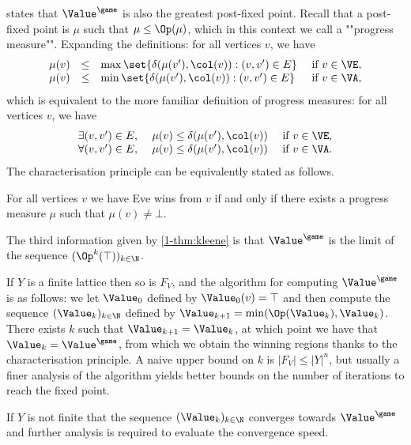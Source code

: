  states that $\Value^{\game}$ is also the greatest post-fixed point.
Recall that a post-fixed point is $\mu$ such that $\mu \le \Op(\mu)$, which in this context we call a ""progress measure"".
Expanding the definitions: for all vertices $v$, we have
\[
\begin{array}{llll}
\mu(v) & \le & \max \set{\delta( \mu(v'), \col(v)) : (v,v') \in E} & \text{ if } v \in \VE, \\
\mu(v) & \le & \min \set{\delta( \mu(v'), \col(v)) : (v,v') \in E} & \text{ if } v \in \VA,
\end{array}
\]
which is equivalent to the more familiar definition of progress measures: for all vertices $v$, we have
\[
\begin{array}{llll}
\exists (v,v') \in E,\ & \mu(v) \le \delta( \mu(v'), \col(v)) & \text{ if } v \in \VE, \\
\forall (v,v') \in E,\ & \mu(v) \le \delta( \mu(v'), \col(v)) & \text{ if } v \in \VA.
\end{array}
\]
The characterisation principle can be equivalently stated as follows.

\begin{property}
\label{1-property:progress_measure}
For all vertices $v$ we have Eve wins from $v$ if and only if there exists a progress measure $\mu$ such that $\mu(v) \neq \bot$.
\end{property}

The third information given by \cref{1-thm:kleene} is that $\Value^{\game}$ is the limit of the sequence $(\Op^k(\top))_{k \in \N}$.

If $Y$ is a finite lattice then so is $F_V$, and the algorithm for computing $\Value^{\game}$ is as follows:
we let $\Value_0$ defined by $\Value_0(v) = \top$ and then compute the sequence $(\Value_k)_{k \in \N}$ defined by 
$\Value_{k+1} = \min(\Op(\Value_k), \Value_k)$.
There exists $k$ such that $\Value_{k+1} = \Value_k$, at which point we have that $\Value_k = \Value^{\game}$,
from which we obtain the winning regions thanks to the characterisation principle.
A naive upper bound on $k$ is $|F_V| \le |Y|^n$, but usually a finer analysis of the algorithm yields better bounds on the number of iterations to reach the fixed point.

If $Y$ is not finite that the sequence $(\Value_k)_{k \in \N}$ converges towards $\Value^{\game}$ and further analysis is required to evaluate the convergence speed.

